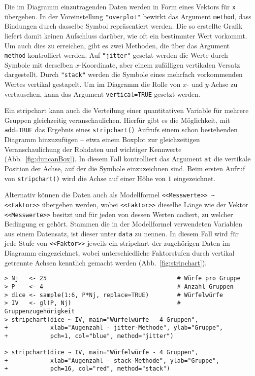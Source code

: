 Die im Diagramm einzutragenden Daten werden in Form eines Vektors für \lstinline!x! übergeben. In der Voreinstellung \lstinline!"overplot"! bewirkt das Argument \lstinline!method!, dass Bindungen durch dasselbe Symbol repräsentiert werden. Die so erstellte Grafik liefert damit keinen Aufschluss darüber, wie oft ein bestimmter Wert vorkommt. Um auch dies zu erreichen, gibt es zwei Methoden, die über das Argument \lstinline!method! kontrolliert werden. Auf \lstinline!"jitter"! gesetzt werden die Werte durch Symbole mit derselben $x$-Koordinate, aber einem zufälligen vertikalen Versatz dargestellt. Durch \lstinline!"stack"! werden die Symbole eines mehrfach vorkommenden Wertes vertikal gestapelt. Um im Diagramm die Rolle von $x$- und $y$-Achse zu vertauschen, kann das Argument \lstinline!vertical=TRUE! gesetzt werden.

Ein stripchart kann auch die Verteilung einer quantitativen Variable für mehrere Gruppen gleichzeitig veranschaulichen. Hierfür gibt es die Möglichkeit, mit \lstinline!add=TRUE! das Ergebnis eines \lstinline!stripchart()! Aufrufs einem schon bestehenden Diagramm hinzuzufügen -- etwa einem Boxplot zur gleichzeitigen Veranschaulichung der Rohdaten und wichtiger Kennwerte (Abb.\ \ref{fig:duncanBox}). In diesem Fall kontrolliert das Argument \lstinline!at! die vertikale Position der Achse, auf der die Symbole einzuzeichnen sind. Beim ersten Aufruf von \lstinline!stripchart()! wird die Achse auf einer Höhe von $1$ eingezeichnet.

Alternativ können die Daten auch als Modellformel \lstinline!<<Messwerte>> ~ <<Faktor>>! übergeben werden, wobei \lstinline!<<Faktor>>! dieselbe Länge wie der Vektor \lstinline!<<Messwerte>>! besitzt und für jeden von dessen Werten codiert, zu welcher Bedingung er gehört. Stammen die in der Modellformel verwendeten Variablen aus einem Datensatz, ist dieser unter \lstinline!data! zu nennen. In diesem Fall wird für jede Stufe von \lstinline!<<Faktor>>! jeweils ein stripchart der zugehörigen Daten im Diagramm eingezeichnet, wobei unterschiedliche Faktorstufen durch vertikal getrennte Achsen kenntlich gemacht werden (Abb.\ \ref{fig:stripchart}).
\begin{lstlisting}
> Nj   <- 25                                     # Würfe pro Gruppe
> P    <- 4                                      # Anzahl Gruppen
> dice <- sample(1:6, P*Nj, replace=TRUE)        # Würfelwürfe
> IV   <- gl(P, Nj)                              # Gruppenzugehörigkeit
> stripchart(dice ~ IV, main="Würfelwürfe - 4 Gruppen",
+            xlab="Augenzahl - jitter-Methode", ylab="Gruppe",
+            pch=1, col="blue", method="jitter")

> stripchart(dice ~ IV, main="Würfelwürfe - 4 Gruppen",
+            xlab="Augenzahl - stack-Methode", ylab="Gruppe",
+            pch=16, col="red", method="stack")
\end{lstlisting}

